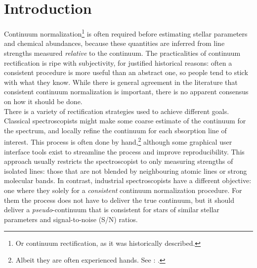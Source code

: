 \documentclass[modern]{aastex631}
\begin{document}


\section*{}\clearpage
\section{Introduction}\label{sec:intro}

Continuum normalization\footnote{Or continuum rectification, as it was historically described.} is often required before estimating stellar parameters and chemical abundances, because these quantities are inferred from line strengths measured \emph{relative} to the continuum.
The practicalities of continuum rectification is ripe with subjectivity, for justified historical reasons: often a consistent procedure is more useful than an abstract one, so people tend to stick with what they know. While there is general agreement in the literature that consistent continuum normalization is important, there is no apparent consensus on how it should be done.\\

There is a variety of rectification strategies used to achieve different goals. Classical spectroscopists might make some coarse estimate of the continuum for the spectrum, and locally refine the continuum for each sbsorption line of interest. This process is often done by hand,\footnote{Albeit they are often experienced hands. See \citet{Bensby:2014}: .} although some graphical user interface tools exist to streamline the process and improve reproducibility. This approach usually restricts the spectroscopist to only measuring strengths of isolated lines: those that are not blended by neighbouring atomic lines or strong molecular bands. In contrast, industrial spectroscopists have a different objective: one where they solely for a \emph{consistent} continuum normalization procedure. For them the process does not have to deliver the true continuum, but it should deliver a \emph{pseudo}-continuum that is consistent for stars of similar stellar parameters and signal-to-noise (S/N) ratios.\\
\end{document}
